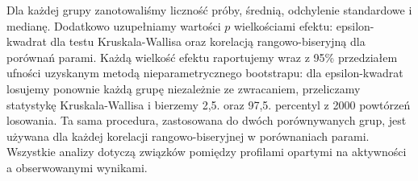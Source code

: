 Dla każdej grupy zanotowaliśmy liczność próby, średnią, odchylenie standardowe i medianę. Dodatkowo uzupełniamy wartości $p$ wielkościami efektu: epsilon-kwadrat dla testu Kruskala-Wallisa oraz korelacją rangowo-biseryjną dla porównań parami. Każdą wielkość efektu raportujemy wraz z 95\% przedziałem ufności uzyskanym metodą nieparametrycznego bootstrapu: dla epsilon-kwadrat losujemy ponownie każdą grupę niezależnie ze zwracaniem, przeliczamy statystykę Kruskala-Wallisa i bierzemy 2,5. oraz 97,5. percentyl z 2000 powtórzeń losowania. Ta sama procedura, zastosowana do dwóch porównywanych grup, jest używana dla każdej korelacji rangowo-biseryjnej w porównaniach parami. Wszystkie analizy dotyczą związków pomiędzy profilami opartymi na aktywności a obserwowanymi wynikami.
